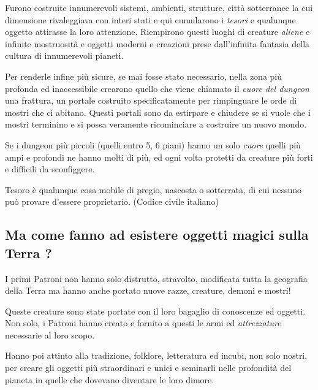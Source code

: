 \begin{multicols}{2}
Furono costruite innumerevoli sistemi, ambienti, strutture, città sotterranee la cui dimensione rivaleggiava con interi stati e qui cumularono i \emph{tesori} e qualunque oggetto attirasse la loro attenzione. Riempirono questi luoghi di creature \emph{aliene} e infinite mostruosità e oggetti moderni e creazioni prese dall'infinita fantasia della cultura di innumerevoli pianeti.

Per renderle infine più sicure, se mai fosse stato necessario, nella zona più profonda ed inaccessibile crearono quello che viene chiamato il \emph{cuore del dungeon} una frattura, un portale costruito specificatamente per rimpinguare le orde di mostri che ci abitano. Questi portali sono da estirpare e chiudere se si vuole che i mostri terminino e si possa veramente ricominciare a costruire un nuovo mondo.

Se i dungeon più piccoli (quelli entro 5, 6 piani) hanno un solo \emph{cuore} quelli più ampi e profondi ne hanno molti di più, ed ogni volta protetti da creature più forti e difficili da sconfiggere.

\medskip

\begin{changemargin}{0.3cm}{0.3cm}\begin{enfasi}

Tesoro è qualunque cosa mobile di pregio, nascosta o sotterrata, di cui nessuno può provare d'essere proprietario. (Codice civile italiano)

\end{enfasi}\end{changemargin}

\subsection*{Ma come fanno ad esistere oggetti magici sulla Terra ?}

I primi Patroni non hanno solo distrutto, stravolto, modificata tutta la geografia della Terra ma hanno anche portato nuove razze, creature, demoni e mostri!

Queste creature sono state portate con il loro bagaglio di conoscenze ed oggetti. Non solo, i Patroni hanno creato e fornito a questi le armi ed \emph{attrezzature} necessarie al loro scopo.

Hanno poi attinto alla tradizione, folklore, letteratura ed incubi, non solo nostri, per creare gli oggetti più straordinari e unici e seminarli nelle profondità del pianeta in quelle che dovevano diventare le loro dimore.


\end{multicols}
